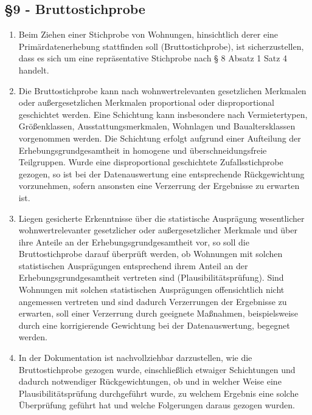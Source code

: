     \subsection{\S9 - Bruttostichprobe}
    \begin{enumerate}[label=(\arabic*)]
        \item Beim Ziehen einer Stichprobe von Wohnungen, hinsichtlich derer eine Primärdatenerhebung stattfinden soll (Bruttostichprobe), ist sicherzustellen, dass es sich um eine
repräsentative Stichprobe nach § 8 Absatz 1 Satz 4 handelt.
        \item Die Bruttostichprobe kann nach wohnwertrelevanten gesetzlichen Merkmalen oder außergesetzlichen Merkmalen proportional oder disproportional geschichtet werden. Eine Schichtung kann insbesondere nach Vermietertypen, Größenklassen, Ausstattungsmerkmalen, Wohnlagen und Baualtersklassen vorgenommen werden. Die Schichtung erfolgt aufgrund einer Aufteilung der Erhebungsgrundgesamtheit in homogene und überschneidungsfreie Teilgruppen. Wurde eine disproportional geschichtete Zufallsstichprobe gezogen, so ist bei der Datenauswertung eine entsprechende Rückgewichtung vorzunehmen, sofern ansonsten eine Verzerrung der Ergebnisse zu erwarten ist. 
        \item Liegen gesicherte Erkenntnisse über die statistische Ausprägung wesentlicher wohnwertrelevanter gesetzlicher oder außergesetzlicher Merkmale und über ihre Anteile an der Erhebungsgrundgesamtheit vor, so soll die Bruttostichprobe darauf überprüft werden, ob Wohnungen mit solchen statistischen Ausprägungen entsprechend ihrem Anteil an der Erhebungsgrundgesamtheit vertreten sind (Plausibilitätsprüfung). Sind Wohnungen mit solchen statistischen Ausprägungen offensichtlich nicht angemessen vertreten und sind dadurch Verzerrungen der Ergebnisse zu erwarten, soll einer Verzerrung durch geeignete Maßnahmen, beispielsweise durch eine korrigierende Gewichtung bei der Datenauswertung, begegnet werden.
        \item In der Dokumentation ist nachvollziehbar darzustellen, wie die Bruttostichprobe gezogen wurde, einschließlich etwaiger Schichtungen und dadurch notwendiger Rückgewichtungen, ob und in welcher Weise eine Plausibilitätsprüfung durchgeführt wurde, zu welchem Ergebnis eine solche Überprüfung geführt hat und welche Folgerungen daraus gezogen wurden. 
    \end{enumerate}

